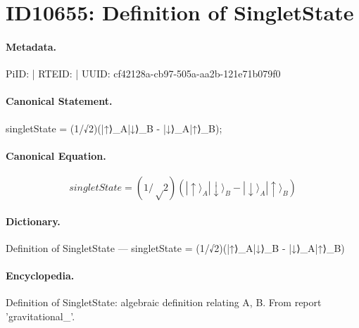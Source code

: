 \section*{ID10655: Definition of SingletState}
\paragraph{Metadata.}
PiID:  | RTEID:  | UUID: cf42128a-cb97-505a-aa2b-121e71b079f0

\paragraph{Canonical Statement.}
singletState = (1/√2)(|↑⟩\_A|↓⟩\_B - |↓⟩\_A|↑⟩\_B);

\paragraph{Canonical Equation.}
\[
singletState = (1/√2)(|↑⟩_A|↓⟩_B - |↓⟩_A|↑⟩_B)
\]

\paragraph{Dictionary.}
Definition of SingletState — singletState = (1/√2)(|↑⟩\_A|↓⟩\_B - |↓⟩\_A|↑⟩\_B)

\paragraph{Encyclopedia.}
Definition of SingletState: algebraic definition relating A, B. From report 'gravitational\_'.

